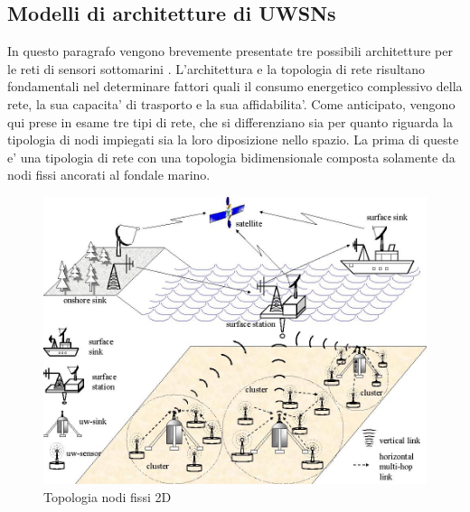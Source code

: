 \subsection{Modelli di architetture di UWSNs}
In questo paragrafo vengono brevemente presentate tre possibili architetture per le reti di sensori sottomarini \cite{underwater}. L'architettura e la topologia di rete risultano fondamentali nel determinare fattori quali il consumo energetico complessivo della rete, la sua capacita' di trasporto e la sua affidabilita'. \newline Come anticipato, vengono qui prese in esame tre tipi di rete, che si differenziano sia per quanto riguarda la tipologia di nodi impiegati sia la loro diposizione nello spazio.  La prima di queste e' una tipologia di rete con una topologia bidimensionale composta solamente da nodi fissi ancorati al fondale marino.

\begin{figure}[H]
    \centering
	\includegraphics[scale=0.3]{2D_arch.jpg}
	\caption{ Topologia nodi fissi 2D}
	\label{fig:}
\end{figure}

